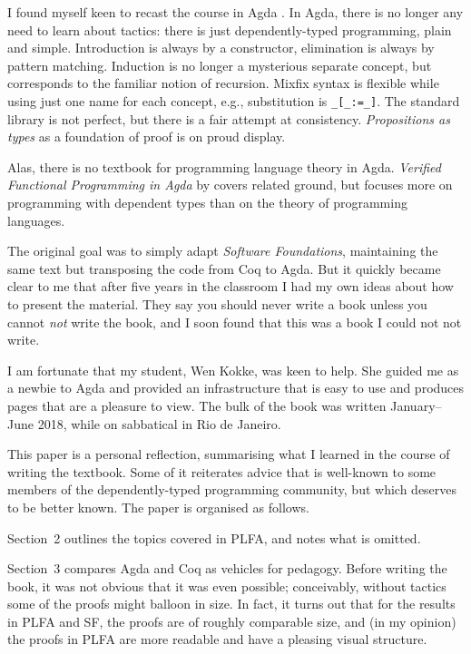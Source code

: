 \documentclass[preprint,authoryear]{elsarticle}
\begin{document}
I found myself keen to recast the course in Agda \citep{Bove-et-al-2009}.
In Agda, there is
no longer any need to learn about tactics: there is just
dependently-typed programming, plain and simple. Introduction is
always by a constructor, elimination is always by pattern
matching. Induction is no longer a mysterious separate concept, but
corresponds to the familiar notion of recursion. Mixfix syntax is
flexible while using just one name for each concept, e.g.,
substitution is \texttt{\_[\_:=\_]}. The standard library is not perfect, but
there is a fair attempt at consistency. \emph{Propositions as types} as a
foundation of proof is on proud display.

Alas, there is no textbook for programming language theory in
Agda.  \emph{Verified Functional Programming in Agda} by \citep{Stump-2016}
covers related ground, but focuses more on programming with dependent
types than on the theory of programming languages.

The original goal was to simply adapt \emph{Software Foundations},
maintaining the same text but transposing the code from Coq to Agda.
But it quickly became clear to me that after five years in the
classroom I had my own ideas about how to present the material.  They
say you should never write a book unless you cannot \emph{not} write the
book, and I soon found that this was a book I could not not write.

I am fortunate that my student, Wen Kokke, was keen to help.  She
guided me as a newbie to Agda and provided an infrastructure that is
easy to use and produces pages that are a pleasure to view.
The bulk of the book was written January--June 2018, while on
sabbatical in Rio de Janeiro.

This paper is a personal reflection, summarising what I learned in the
course of writing the textbook. Some of it reiterates advice that is
well-known to some members of the dependently-typed programming
community, but which deserves to be better known.  The paper is
organised as follows.

Section~2 outlines the
topics covered in PLFA, and notes what is omitted.  

Section~3 compares Agda and Coq as vehicles for pedagogy.  Before
writing the book, it was not obvious that it was even possible;
conceivably, without tactics some of the proofs might
balloon in size. In fact, it turns out that for the results in PLFA
and SF, the proofs are of roughly comparable size, and (in my opinion)
the proofs in PLFA are more readable and have a pleasing visual
structure.
\end{document}
